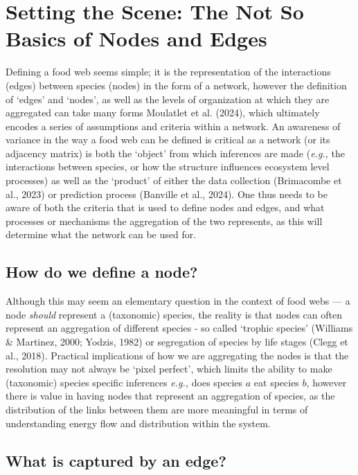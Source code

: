 \documentclass[
]{article}
\begin{document}
\section{Setting the Scene: The Not So Basics of Nodes and
Edges}\label{sec-anatomy}

Defining a food web seems simple; it is the representation of the
interactions (edges) between species (nodes) in the form of a network,
however the definition of `edges' and `nodes', as well as the levels of
organization at which they are aggregated can take many forms Moulatlet
et al. (2024), which ultimately encodes a series of assumptions and
criteria within a network. An awareness of variance in the way a food
web can be defined is critical as a network (or its adjacency matrix) is
both the `object' from which inferences are made (\emph{e.g.,} the
interactions between species, or how the structure influences ecosystem
level processes) as well as the `product' of either the data collection
(Brimacombe et al., 2023) or prediction process (Banville et al., 2024).
One thus needs to be aware of both the criteria that is used to define
nodes and edges, and what processes or mechanisms the aggregation of the
two represents, as this will determine what the network can be used for.

\subsection{How do we define a node?}\label{how-do-we-define-a-node}

Although this may seem an elementary question in the context of food
webs --- a node \emph{should} represent a (taxonomic) species, the
reality is that nodes can often represent an aggregation of different
species - so called `trophic species' (Williams \& Martinez, 2000;
Yodzis, 1982) or segregation of species by life stages (Clegg et al.,
2018). Practical implications of how we are aggregating the nodes is
that the resolution may not always be `pixel perfect', which limits the
ability to make (taxonomic) species specific inferences \emph{e.g.,}
does species \(a\) eat species \(b\), however there is value in having
nodes that represent an aggregation of species, as the distribution of
the links between them are more meaningful in terms of understanding
energy flow and distribution within the system.

\subsection{What is captured by an
edge?}\label{what-is-captured-by-an-edge}
\end{document}
